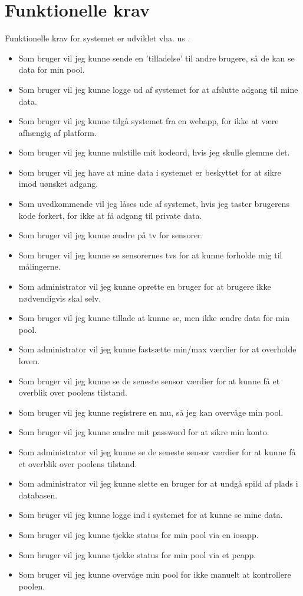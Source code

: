 \section{Funktionelle krav}
Funktionelle krav for systemet er udviklet vha. \gls{us} \cite{margaretrouse2015}.

\begin{itemize}
	\item Som bruger vil jeg kunne sende en ’tilladelse’ til andre brugere, så de kan se data for min pool.
	\item Som bruger vil jeg kunne logge ud af systemet for at afslutte adgang til mine data.
	\item Som bruger vil jeg kunne tilgå systemet fra en \gls{webapp}, for ikke at være afhængig af platform.
	\item Som bruger vil jeg kunne nulstille mit kodeord, hvis jeg skulle glemme det.
	\item Som bruger vil jeg have at mine data i systemet er beskyttet for at sikre imod uønsket adgang.
	\item Som uvedkommende vil jeg låses ude af systemet, hvis jeg taster brugerens kode forkert, for ikke at få adgang til private data.
	\item Som bruger vil jeg kunne ændre på \gls{tv} for sensorer.
	\item Som bruger vil jeg kunne se sensorernes \glspl{tv} for at kunne forholde mig til målingerne.
	\item Som administrator vil jeg kunne oprette en bruger for at brugere ikke nødvendigvis skal selv.
	\item Som bruger vil jeg kunne tillade at kunne se, men ikke ændre data for min pool.
	\item Som administrator vil jeg kunne fastsætte min/max værdier for at overholde loven.
	\item Som bruger vil jeg kunne se de seneste sensor værdier for at kunne få et overblik over poolens tilstand.
	\item Som bruger vil jeg kunne registrere en \gls{mu}, så jeg kan overvåge min pool.
	\item Som bruger vil jeg kunne ændre mit password for at sikre min konto.
	\item Som administrator vil jeg kunne se de seneste sensor værdier for at kunne få et overblik over poolens tilstand.
	\item Som administrator vil jeg kunne slette en bruger for at undgå spild af plads i databasen.
	\item Som bruger vil jeg kunne logge ind i systemet for at kunne se mine data.
	\item Som bruger vil jeg kunne tjekke status for min pool via en \gls{iosapp}.
	\item Som bruger vil jeg kunne tjekke status for min pool via et \gls{pcapp}.
	\item Som bruger vil jeg kunne overvåge min pool for ikke manuelt at kontrollere poolen.
\end{itemize}

\newpage